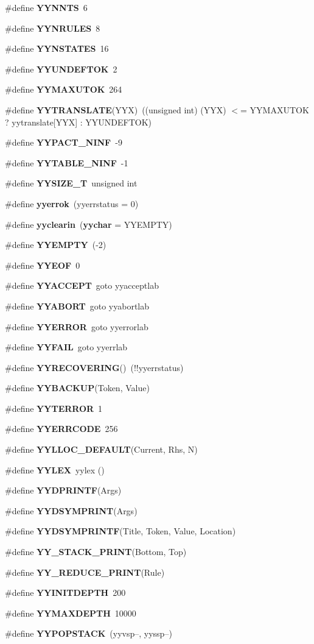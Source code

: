 \begin{CompactItemize}
\#define {\bf YYNNTS}\ 6
\item 
\#define {\bf YYNRULES}\ 8
\item 
\#define {\bf YYNSTATES}\ 16
\item 
\#define {\bf YYUNDEFTOK}\ 2
\item 
\#define {\bf YYMAXUTOK}\ 264
\item 
\#define {\bf YYTRANSLATE}(YYX)\ ((unsigned int) (YYX) $<$= YYMAXUTOK ? yytranslate[YYX] : YYUNDEFTOK)
\item 
\#define {\bf YYPACT\_\-NINF}\ -9
\item 
\#define {\bf YYTABLE\_\-NINF}\ -1
\item 
\#define {\bf YYSIZE\_\-T}\ unsigned int
\item 
\#define {\bf yyerrok}\ (yyerrstatus = 0)
\item 
\#define {\bf yyclearin}\ ({\bf yychar} = YYEMPTY)
\item 
\#define {\bf YYEMPTY}\ (-2)
\item 
\#define {\bf YYEOF}\ 0
\item 
\#define {\bf YYACCEPT}\ goto yyacceptlab
\item 
\#define {\bf YYABORT}\ goto yyabortlab
\item 
\#define {\bf YYERROR}\ goto yyerrorlab
\item 
\#define {\bf YYFAIL}\ goto yyerrlab
\item 
\#define {\bf YYRECOVERING}()\ (!!yyerrstatus)
\item 
\#define {\bf YYBACKUP}(Token, Value)
\item 
\#define {\bf YYTERROR}\ 1
\item 
\#define {\bf YYERRCODE}\ 256
\item 
\#define {\bf YYLLOC\_\-DEFAULT}(Current, Rhs, N)
\item 
\#define {\bf YYLEX}\ yylex ()
\item 
\#define {\bf YYDPRINTF}(Args)
\item 
\#define {\bf YYDSYMPRINT}(Args)
\item 
\#define {\bf YYDSYMPRINTF}(Title, Token, Value, Location)
\item 
\#define {\bf YY\_\-STACK\_\-PRINT}(Bottom, Top)
\item 
\#define {\bf YY\_\-REDUCE\_\-PRINT}(Rule)
\item 
\#define {\bf YYINITDEPTH}\ 200
\item 
\#define {\bf YYMAXDEPTH}\ 10000
\item 
\#define {\bf YYPOPSTACK}\ (yyvsp--, yyssp--)
\end{CompactItemize}
